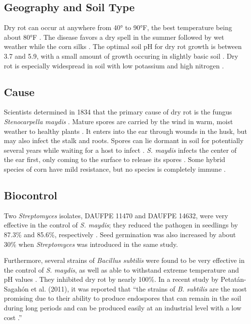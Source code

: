 \documentclass[letterpaper, 12pt]{report}
\begin{document}
\subsection{Geography and Soil Type}

Dry rot can occur at anywhere from 40° to 90°F, the best temperature being about 80°F \autocite{melhus1922dry}. The disease favors a dry spell in the summer followed by wet weather while the corn silks \autocite{ullstrup1961corn, melhus1922dry}. The optimal soil pH for dry rot growth is between 3.7 and 5.9, with a small amount of growth occuring in slightly basic soil \autocite{eddins1930dry}. Dry rot is especially widespread in soil with low potassium and high nitrogen \autocite{ullstrup1961corn}.

\subsection{Cause}

Scientists determined in 1834 that the primary cause of dry rot is the fungus \emph{Stenocarpella maydis} \autocite{durrell1923dry, ullstrup1961corn}. Mature spores are carried by the wind in warm, moist weather to healthy plants \autocite{ullstrup1961corn}. It enters into the ear through wounds in the husk, but may also infect the stalk and roots. Spores can lie dormant in soil for potentially several years while waiting for a host to infect \autocite{eddins1930dry}. \emph{S. maydis} infects the center of the ear first, only coming to the surface to release its spores \autocite{melhus1922dry}. Some hybrid species of corn have mild resistance, but no species is completely immune \autocite{ullstrup1961corn}.

\subsection{Biocontrol}

Two \emph{Streptomyces} isolates, DAUFPE 11470 and DAUFPE 14632, were very effective in the control of \emph{S. maydis}; they reduced the pathogen in seedlings by 87.3\% and 85.6\%, respectively \autocite{bressan2005biological, bressan2003biological}. Seed germination was also increased by about 30\% when \emph{Streptomyces} was introduced in the same study.

Furthermore, several strains of \emph{Bacillus subtilis} were found to be very effective in the control of \emph{S. maydis}, as well as able to withstand extreme temperature and pH values \autocite{petatan2011isolation}. They inhibited dry rot by nearly 100\%. In a recent study by Petat{\'a}n-Sagah{\'o}n et al. (2011), it was reported that ``the strains of \emph{B. subtilis} are the most promising due to their ability to produce endospores that can remain
in the soil during long periods and can be produced easily at an industrial level with a low cost \autocite{stein2005bacillus}.''
\end{document}
